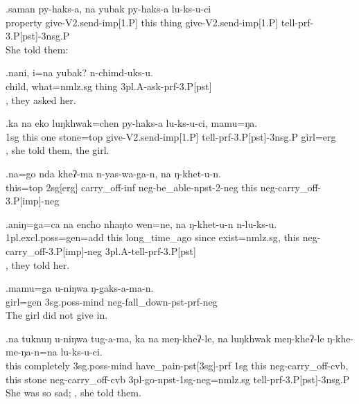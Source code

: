 \exg.saman  py-haks-a,  na yubak   py-haks-a  lu-ks-u-ci\\
property give{\sc -V2.send-imp[1.P]} this thing give{\sc -V2.send-imp[1.P]} tell{\sc -prf-3.P[pst]-3nsg.P}\\
She told them: 

\exg.nani,  i=na   yubak? n-chimd-uks-u.\\
child, what{\sc =nmlz.sg} thing {\sc 3pl.A-}ask{\sc -prf-3.P[pst]}\\
, they asked her.

\exg.ka na eko luŋkhwak=chen py-haks-a  lu-ks-u-ci,    mamu=ŋa.\\
{\sc 1sg} this one stone{\sc =top}  give{\sc -V2.send-imp[1.P]} tell{\sc -prf-3.P[pst]-3nsg.P} girl{\sc =erg}\\
, she told them, the girl.

\exg.na=go nda  kheʔ-ma  n-yas-wa-ga-n,   na ŋ-khet-u-n.\\
this{\sc =top}  {\sc 2sg[erg]} carry\_off{\sc -inf} {\sc neg-}be\_able{\sc -npst-2-neg}  this {\sc neg-}carry\_off{\sc -3.P[imp]-neg}\\

\exg.aniŋ=ga=ca   na encho nhaŋto  wen=ne,   na ŋ-khet-u-n   n-lu-ks-u.\\
{\sc 1pl.excl.poss=gen=add} this long\_time\_ago since exist{\sc [3sg]=nmlz.sg}, this {\sc neg-}carry\_off{\sc -3.P[imp]-neg} {\sc 3pl.A-}tell{\sc -prf-3.P[pst]}\\
, they told her.

\exg.mamu=ga  u-niŋwa  ŋ-gaks-a-ma-n.\\
girl{\sc =gen} {\sc 3sg.poss-}mind {\sc neg-}fall\_down{\sc -pst-prf-neg}\\
The girl did not give in.

\exg.na tuknuŋ  u-niŋwa  tug-a-ma,   ka  na meŋ-kheʔ-le, na luŋkhwak meŋ-kheʔ-le ŋ-khe-me-ŋa-n=na   lu-ks-u-ci.\\
this completely {\sc 3sg.poss-}mind have\_pain{\sc -pst[3sg]-prf} {\sc 1sg} this {\sc neg-}carry\_off{\sc -cvb}, this stone {\sc neg-}carry\_off{\sc -cvb} {\sc 3pl-}go{\sc -npst-1sg-neg=nmlz.sg} tell{\sc -prf-3.P[pst]-3nsg.P}\\
She was so sad; , she told them.

